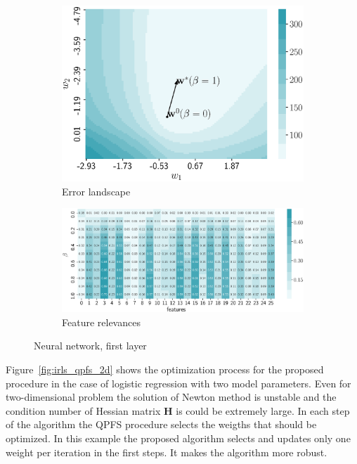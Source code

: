 \documentclass[a4paper,12pt]{article}
\theoremstyle{plain} %
\theoremstyle{definition} %
\theoremstyle{remark} %
\newcommand{\bH}{\mathbf{H}}
\begin{document}
  \begin{figure}
  	\centering
  	\begin{subfigure}{.5\textwidth}
  		\centering
  		\includegraphics[width=\linewidth]{figs/neural_error.eps}
  		\caption{Error landscape}
  		\label{fig:neural_error}
  	\end{subfigure}%
  	\begin{subfigure}{.5\textwidth}
  		\centering
  		\includegraphics[width=\linewidth]{figs/neural_b_wrt_beta.eps}
  		\caption{Feature relevances}
  		\label{fig:neural_b_wrt_beta}
  	\end{subfigure}
  	\caption{Neural network, first layer}
  \end{figure}

	Figure~\ref{fig:irls_qpfs_2d} shows the optimization process for the proposed procedure in the case of logistic regression with two model parameters. 
	Even for two-dimensional problem the solution of Newton method is unstable and the condition number of Hessian matrix $\bH$ is could be extremely large. 
	In each step of the algorithm the QPFS procedure selects the weigths that should be optimized. In this example the proposed algorithm selects and updates only one weight per iteration in the first steps. It makes the algorithm more robust.
	
\end{document}

